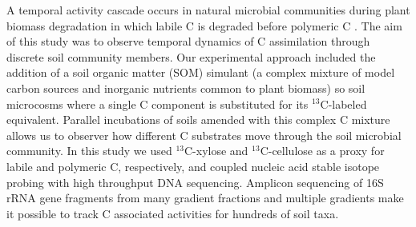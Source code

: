 A temporal activity cascade occurs in natural microbial communities during
plant biomass degradation in which labile C is degraded before polymeric
C \citep{Hu_1997,Rui_2009}.  The aim of this study was to observe temporal
dynamics of C assimilation through discrete soil community members. Our
experimental approach included the addition of a soil organic matter (SOM)
simulant (a complex mixture of model carbon sources and inorganic nutrients
common to plant biomass) so soil microcosms where a single C component is
substituted for its $^{13}$C-labeled equivalent. Parallel incubations of soils
amended with this complex C mixture allows us to observer how different
C substrates move through the soil microbial community. In this study we used
$^{13}$C-xylose and $^{13}$C-cellulose as a proxy for labile and polymeric C,
respectively, and coupled nucleic acid stable isotope probing with high
throughput DNA sequencing. Amplicon sequencing of 16S rRNA
gene fragments from many gradient fractions and multiple gradients make it
possible to track C associated activities for hundreds of soil taxa.
